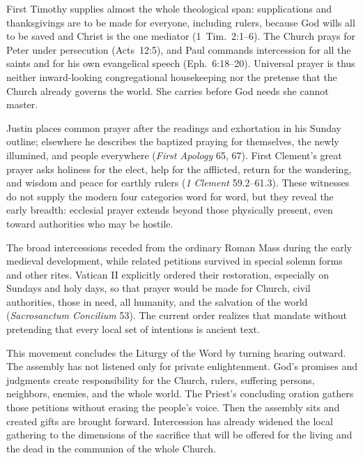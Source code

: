 First Timothy supplies almost the whole theological span: supplications and thanksgivings are to be made for everyone, including rulers, because God wills all to be saved and Christ is the one mediator (1~Tim.~2:1--6). The Church prays for Peter under persecution (Acts~12:5), and Paul commands intercession for all the saints and for his own evangelical speech (Eph.~6:18--20). Universal prayer is thus neither inward-looking congregational housekeeping nor the pretense that the Church already governs the world. She carries before God needs she cannot master.

Justin places common prayer after the readings and exhortation in his Sunday outline; elsewhere he describes the baptized praying for themselves, the newly illumined, and people everywhere (\emph{First Apology} 65, 67). First Clement's great prayer asks holiness for the elect, help for the afflicted, return for the wandering, and wisdom and peace for earthly rulers (\emph{1 Clement} 59.2--61.3). These witnesses do not supply the modern four categories word for word, but they reveal the early breadth: ecclesial prayer extends beyond those physically present, even toward authorities who may be hostile.

The broad intercessions receded from the ordinary Roman Mass during the early medieval development, while related petitions survived in special solemn forms and other rites. Vatican II explicitly ordered their restoration, especially on Sundays and holy days, so that prayer would be made for Church, civil authorities, those in need, all humanity, and the salvation of the world (\emph{Sacrosanctum Concilium} 53). The current order realizes that mandate without pretending that every local set of intentions is ancient text.

This movement concludes the Liturgy of the Word by turning hearing outward. The assembly has not listened only for private enlightenment. God's promises and judgments create responsibility for the Church, rulers, suffering persons, neighbors, enemies, and the whole world. The Priest's concluding oration gathers those petitions without erasing the people's voice. Then the assembly sits and created gifts are brought forward. Intercession has already widened the local gathering to the dimensions of the sacrifice that will be offered for the living and the dead in the communion of the whole Church.
